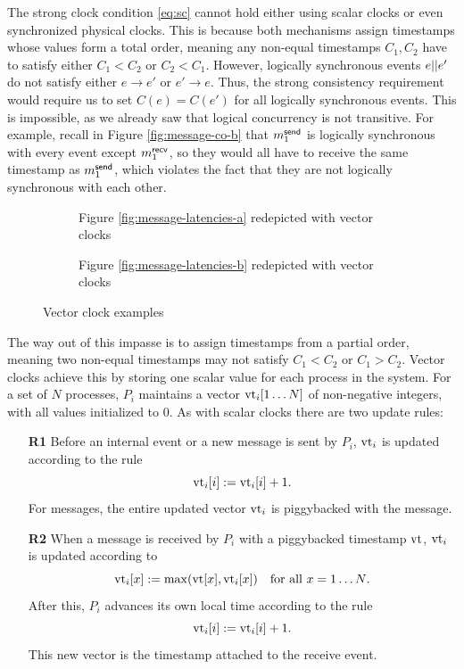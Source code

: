 \documentclass[]             %
{NASA}                       %
\theoremstyle{definition}
\begin{document}
The strong clock condition \eqref{eq:sc} cannot hold either using
scalar clocks or even synchronized physical clocks. This is because
both mechanisms assign timestamps whose values form a total order, meaning any
non-equal timestamps $C_1, C_2$ have to satisfy either $C_1 < C_2$ or
$C_2 < C_1$. However, logically synchronous events $e || e'$ do not
satisfy either $e \to e'$ or $e' \to e$. Thus, the strong consistency
requirement would require us to set $C(e) = C(e')$ for all logically
synchronous events. This is impossible, as we already saw that logical
concurrency is not transitive. For example, recall in Figure
\ref{fig:message-co-b} that $m_{1}^{\mathsf{send}}$ is logically
synchronous with every event except $m_{1}^{\mathsf{recv}}$, so they would
all have to receive the same timestamp as $m_{1}^{\mathsf{send}}$, which
violates the fact that they are not logically synchronous with each
other.

\begin{figure}
  \setlength\belowcaptionskip{5ex}

  \begin{subfigure}{1\textwidth}
    \centering
    
    \caption{Figure \ref{fig:message-latencies-a} redepicted with vector clocks}
    \label{fig:message-latencies-vector-a}
  \end{subfigure}

  \vspace{4ex}

  \begin{subfigure}{1\textwidth}
    \centering 
    \caption{Figure \ref{fig:message-latencies-b} redepicted with vector clocks}
    \label{fig:message-latencies-vector-b}
  \end{subfigure}

  \caption{Vector clock examples}
  \label{fig:message-latencies-vector}
\end{figure}
\afterpage{\clearpage}

The way out of this impasse is to assign timestamps from a partial
order, meaning two non-equal timestamps may not satisfy $C_1 < C_2$ or
$C_1 > C_2$. Vector clocks achieve this by storing one scalar value
for each process in the system. For a set of $N$ processes, $P_i$
maintains a vector $\textrm{vt}_i[1 \ldots N]$ of non-negative integers, with
all values initialized to $0$. As with scalar clocks there
are two update rules:
\begin{enumerate}
\item[\textbf{R1}] Before an internal event or a new message is sent by $P_i$,
  $\textrm{vt}_i$ is updated according to the rule
  \[\textrm{vt}_i[i] := \textrm{vt}_i[i] + 1.\]
  For messages, the entire updated vector $\textrm{vt}_i$ is piggybacked with
  the message.
\item[\textbf{R2}] When a message is received by $P_i$ with a
  piggybacked timestamp $\textrm{vt}$, $\textrm{vt}_i$ is updated according to
  \[\textrm{vt}_i[x] := \max(\textrm{vt}[x], \textrm{vt}_i[x]) \quad \textrm{for all $x = 1\ldots N$}.\]
  After this, $P_i$ advances its own local time according to the rule
  \[ \textrm{vt}_i[i] := \textrm{vt}_i[i] + 1.\]
  This new vector is the timestamp attached to the receive event.
\end{enumerate}
\end{document}
